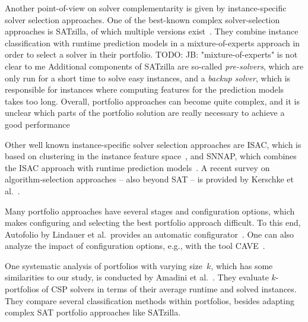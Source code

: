 \documentclass[conference]{IEEEtran}
\newcommand{\todo}[1]{{\color{red}TODO: #1}}
\begin{document}
Another point-of-view on solver complementarity is given by instance-specific solver selection approaches. %
One of the best-known complex solver-selection approaches is SATzilla, of which multiple versions exist~\cite{xu2008satzilla, xu2012satzilla2012}. 
They combine instance classification with runtime prediction models in a mixture-of-experts approach in order to select a solver in their portfolio. 
\todo{JB: "mixture-of-experts" is not clear to me} %
Additional components of SATzilla are so-called \emph{pre-solvers}, which are only run for a short time to solve easy instances, and a \emph{backup solver}, which is responsible for instances where computing features for the prediction models takes too long.
Overall, portfolio approaches can become quite complex, and it is unclear which parts of the portfolio solution are really necessary to achieve a good performance %

Other well known instance-specific solver selection approaches are ISAC, which is based on clustering in the instance feature space~\cite{Kadioglu:2010:ISAC}, and SNNAP, which combines the ISAC approach with runtime prediction models~\cite{Collautti:2013:SNNAP}.
A recent survey on algorithm-selection approaches -- also beyond SAT -- is provided by Kerschke et al.~\cite{kerschke2019automated}.

Many portfolio approaches have several stages and configuration options, which makes configuring and selecting the best portfolio approach difficult.
To this end, Autofolio by Lindauer et al.\ provides an automatic configurator~\cite{lindauer2015autofolio}.
One can also analyze the impact of configuration options, e.g., with the tool CAVE~\cite{biedenkapp2018cave}.

One systematic analysis of portfolios with varying size~$k$, which has some similarities to our study, is conducted by Amadini et al.~\cite{amadini2014empirical, amadini201 6extensive}.
They evaluate $k$-portfolios of CSP solvers in terms of their average runtime and solved instances. 
They compare several classification methods within portfolios, besides adapting complex SAT portfolio approaches like SATzilla. 
\end{document}
